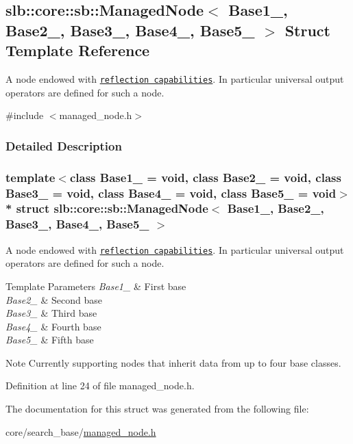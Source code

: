 \hypertarget{structslb_1_1core_1_1sb_1_1ManagedNode}{}\subsection{slb\+:\+:core\+:\+:sb\+:\+:Managed\+Node$<$ Base1\+\_\+, Base2\+\_\+, Base3\+\_\+, Base4\+\_\+, Base5\+\_\+ $>$ Struct Template Reference}
\label{structslb_1_1core_1_1sb_1_1ManagedNode}


A node endowed with \href{http://stackoverflow.com/a/11744832/2725810}{\tt reflection capabilities}. In particular universal output operators are defined for such a node.  




{\ttfamily \#include $<$managed\+\_\+node.\+h$>$}



\subsubsection{Detailed Description}
\subsubsection*{template$<$class Base1\+\_\+ = void, class Base2\+\_\+ = void, class Base3\+\_\+ = void, class Base4\+\_\+ = void, class Base5\+\_\+ = void$>$\\*
struct slb\+::core\+::sb\+::\+Managed\+Node$<$ Base1\+\_\+, Base2\+\_\+, Base3\+\_\+, Base4\+\_\+, Base5\+\_\+ $>$}

A node endowed with \href{http://stackoverflow.com/a/11744832/2725810}{\tt reflection capabilities}. In particular universal output operators are defined for such a node. 


\begin{DoxyTemplParams}{Template Parameters}
{\em Base1\+\_\+} & First base \\
\hline
{\em Base2\+\_\+} & Second base \\
\hline
{\em Base3\+\_\+} & Third base \\
\hline
{\em Base4\+\_\+} & Fourth base \\
\hline
{\em Base5\+\_\+} & Fifth base \\
\hline
\end{DoxyTemplParams}
\begin{DoxyNote}{Note}
Currently supporting nodes that inherit data from up to four base classes. 
\end{DoxyNote}


Definition at line 24 of file managed\+\_\+node.\+h.



The documentation for this struct was generated from the following file\+:\begin{DoxyCompactItemize}
\item 
core/search\+\_\+base/\hyperlink{managed__node_8h}{managed\+\_\+node.\+h}\end{DoxyCompactItemize}
